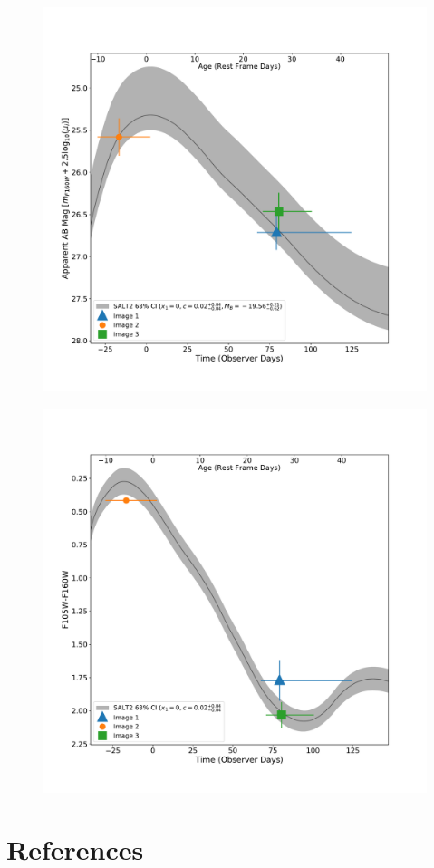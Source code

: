 \documentclass[12pt,dvipsnames]{article}
\begin{document}
\begin{figure}[h!]
    \centering
    \includegraphics[width=\textwidth]{Paper/Figures/full_lightcurve_full.pdf}
    \caption{\label{fig:full_lightcurve}}
\end{figure}
\begin{figure}[h!]
    \centering
    \includegraphics[width=\textwidth]{Paper/Figures/full_colorcurve_total.pdf}
    \caption{\label{fig:full_colorcurve}}
\end{figure}
\clearpage
\section*{References}
\end{document}
